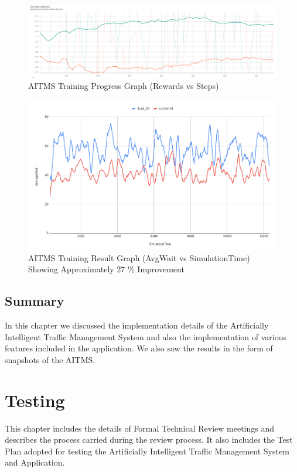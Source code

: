 \documentclass[openany,12pt]{report}
\begin{document}
		\begin{figure}[H]
			\centering
			\includegraphics[width=6in]{./Diagrams/PNG/graph}
			\caption{AITMS Training Progress Graph (Rewards vs Steps)}
		\end{figure}		
		
		\begin{figure}[H]
			\centering
			\includegraphics[width=6in]{./Diagrams/PNG/result}
			\caption{AITMS Training Result Graph (AvgWait vs SimulationTime) Showing Approximately 27 \% Improvement}
		\end{figure}	
		
		
		\section{Summary}
		\hspace*{0.5in}In this chapter we discussed the implementation details of the Artificially Intelligent Traffic Management System and also the implementation of various features included in the application. We also saw the results in the form of snapshots of the AITMS.
		
		
		\chapter{Testing}
		\hspace*{0.5in}This chapter includes the details of Formal Technical Review meetings and describes the process carried during the review process. It also includes the Test Plan adopted for testing the Artificially Intelligent Traffic Management System and Application.
\end{document}
